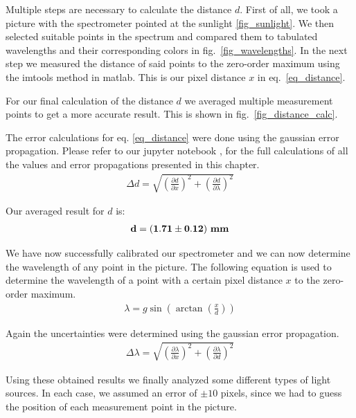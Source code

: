 Multiple steps are necessary to calculate the distance $d$.
First of all, we took a picture with the spectrometer pointed at the sunlight \ref{fig_sunlight}. We then selected suitable 
points in the spectrum and compared them to tabulated wavelengths and their corresponding colors 
in fig.~\ref{fig_wavelengths}. In the next step we measured the distance of said points to the zero-order maximum
using the imtools method in matlab. This is our pixel distance $x$ in eq.~\ref{eq_distance}.

For our final calculation of the distance $d$ we averaged multiple measurement points to get a more
accurate result. This is shown in fig.~\ref{fig_distance_calc}.

The error calculations for eq. \ref{eq_distance} were done using the gaussian error propagation.
Please refer to our jupyter notebook \cite{GitHub}, for the full calculations of all the values and 
error propagations presented in this chapter. 
\begin{align}
    \Delta d = \sqrt{\left(\frac{\partial d}{\partial x}\right)^2 + \left(\frac{\partial d}{\partial \lambda}\right)^2}
\end{align}

Our averaged result for $d$ is:
\begin{align}
    \bf d = (1.71 \pm 0.12) ~\si{\bf\milli\meter} \label{res_d}
\end{align}

We have now successfully calibrated our spectrometer and we can now determine the wavelength
of any point in the picture.
The following equation is used to determine the wavelength of a point with a certain pixel 
distance $x$ to the zero-order maximum.
\begin{align}
    \lambda = g \sin\left(\arctan\left(\frac{x}{d}\right)\right) \label{eq_lambda}
\end{align}

Again the uncertainties were determined using the gaussian error propagation.
\begin{align}
    \Delta \lambda = \sqrt{\left(\frac{\partial \lambda}{\partial x}\right)^2 + \left(\frac{\partial \lambda}{\partial d}\right)^2}
\end{align}

Using these obtained results we finally analyzed some different types of light
sources. In each case, we assumed an error of $\pm 10$ pixels, since we had to guess the position of each measurement point in the picture.

\newpage

